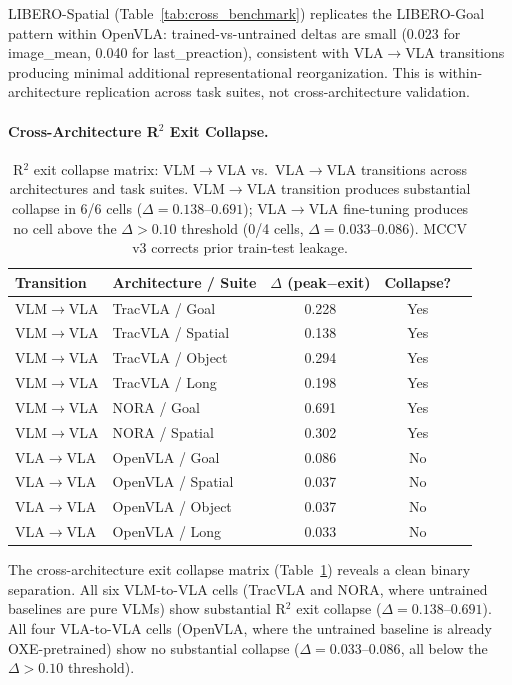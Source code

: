 \documentclass[letterpaper]{article}
\begin{document}
LIBERO-Spatial (Table~\ref{tab:cross_benchmark}) replicates the LIBERO-Goal pattern within OpenVLA: trained-vs-untrained deltas are small (0.023 for image\_mean, 0.040 for last\_preaction), consistent with VLA$\to$VLA transitions producing minimal additional representational reorganization. This is within-architecture replication across task suites, not cross-architecture validation.

\paragraph{Cross-Architecture R$^2$ Exit Collapse.}
\label{sec:cross_arch_collapse}

\begin{table}[h]
\centering
\caption{R$^2$ exit collapse matrix: VLM$\to$VLA vs.\ VLA$\to$VLA transitions across architectures and task suites. VLM$\to$VLA transition produces substantial collapse in 6/6 cells ($\Delta = 0.138$--$0.691$); VLA$\to$VLA fine-tuning produces no cell above the $\Delta > 0.10$ threshold (0/4 cells, $\Delta = 0.033$--$0.086$). MCCV v3 corrects prior train-test leakage.}
\label{tab:exit_collapse_matrix}
\begin{tabular}{llccc}
\toprule
Transition & Architecture / Suite & $\Delta$ (peak$-$exit) & Collapse? \\
\midrule
VLM$\to$VLA & TracVLA / Goal & 0.228 & Yes \\
VLM$\to$VLA & TracVLA / Spatial & 0.138 & Yes \\
VLM$\to$VLA & TracVLA / Object & 0.294 & Yes \\
VLM$\to$VLA & TracVLA / Long & 0.198 & Yes \\
VLM$\to$VLA & NORA / Goal & 0.691 & Yes \\
VLM$\to$VLA & NORA / Spatial & 0.302 & Yes \\
\midrule
VLA$\to$VLA & OpenVLA / Goal & 0.086 & No \\
VLA$\to$VLA & OpenVLA / Spatial & 0.037 & No \\
VLA$\to$VLA & OpenVLA / Object & 0.037 & No \\
VLA$\to$VLA & OpenVLA / Long & 0.033 & No \\
\bottomrule
\end{tabular}
\end{table}

The cross-architecture exit collapse matrix (Table~\ref{tab:exit_collapse_matrix}) reveals a clean binary separation. All six VLM-to-VLA cells (TracVLA and NORA, where untrained baselines are pure VLMs) show substantial R$^2$ exit collapse ($\Delta = 0.138$--$0.691$). All four VLA-to-VLA cells (OpenVLA, where the untrained baseline is already OXE-pretrained) show no substantial collapse ($\Delta = 0.033$--$0.086$, all below the $\Delta > 0.10$ threshold).
\end{document}
